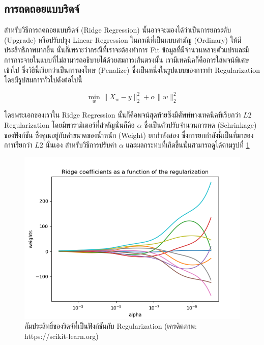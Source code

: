 \subsection{การถดถอยแบบริดจ์}
\label{ssec:ridge_reg}

สำหรับวิธีการถดถอยแบบริดจ์ (Ridge Regression) นั้นอาจจะมองได้ว่าเป็นการยกระดับ (Upgrade) หรือปรับปรุง Linear Regression ในกรณีที่เป็นแบบสามัญ (Ordinary) ให้มีประสิทธิภาพมากขึ้น นั่นก็เพราะว่ากรณีที่เราจะต้องทำการ Fit ข้อมูลที่มีจำนวนหลายตัวแปรและมีการกระจายในแบบที่ไม่สามารถอธิบายได้ด้วยสมการเส้นตรงนั้น เรามีเทคนิคก็คือการใส่พจน์พิเศษเข้าไป ซึ่งวิธีนี้เรียกว่าเป็นการลงโทษ (Penalize) ซึ่งเป็นหนึ่งในรูปแบบของการทำ Regularization โดยมีรูปสมการทั่วไปดังต่อไปนี้

\begin{equation}
    \min_{w} \lVert X_{w} - y \rVert_{2}^{2} + \alpha \lVert w \rVert_{2}^{2}
\end{equation}

\noindent โดยพระเอกของเราใน Ridge Regression นั้นก็คือพจน์สุดท้ายซึ่งมีศัพท์ทางเทคนิคที่เรียกว่า $L2$ Regularization โดยมีพารามิเตอร์ที่สำคัญนั่นก็คือ $\alpha$ ซึ่งเป็นตัวปรับจำนวนการหด (Schrinkage) ของฟังก์ชัน ซึ่งคูณอยู่กับค่าขนาดของน้ำหนัก (Weight) ยกกำลังสอง ซึ่งการยกกำลังนี้เป็นที่มาของการเรียกว่า $L2$ นั่นเอง สำหรับวิธีการปรับค่า $\alpha$ และผลกระทบที่เกิดขึ้นนั้นสามารถดูได้ตามรูปที่ \ref{fig:ridge_res}

\begin{figure}[H]
    \centering
    \includegraphics[width=0.8\linewidth]{fig/plot_ridge_regression.png}
    \caption{สัมประสิทธิ์ของริดจ์ที่เป็นฟังก์ชันกับ Regularization (เครดิตภาพ: https://scikit-learn.org)}
    \label{fig:ridge_res}
\end{figure}

